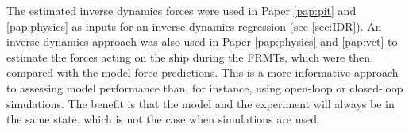 The estimated inverse dynamics forces were used in Paper \ref{pap:pit} and \ref{pap:physics} as inputs for an inverse dynamics regression (see \autoref{sec:IDR}). 
An inverse dynamics approach was also used in Paper \ref{pap:physics} and \ref{pap:vct} to estimate the forces acting on the ship during the FRMTs, which were then compared with the model force predictions. This is a more informative approach to assessing model performance than, for instance, using open-loop or closed-loop simulations. The benefit is that the model and the experiment will always be in the same state, which is not the case when simulations are used.